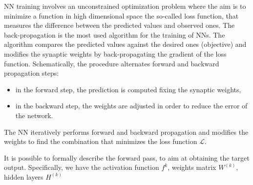 \documentclass[a4,12pt]{article}
\begin{document}


NN training involves an unconstrained optimization problem where the aim is to minimize a
function in high dimensional space the so-called loss function, that measures the difference between the predicted values and observed ones.
The back-propagation is the most used algorithm for the training of NNs. The algorithm compares the predicted values against the desired ones (objective)
and modifies the synaptic weights by back-propagating the gradient of the loss function. Schematically,
the procedure alternates forward and backward propagation steps:
\begin{itemize}
\item in the forward step, the prediction is computed fixing the synaptic weights,
\item in the backward step, the weights are adjusted in order to reduce the error of the network.
\end{itemize}
The NN iteratively performs forward and backward propagation and modifies the weights to
find the combination that minimizes the loss function $\mathcal{L}$.

It is possible to formally describe the forward pass, to aim at obtaining the target output. Specifically, we have the activation function $f^k$, weights matrix $W^{(k)}$, hidden layers $H^{(k)}$
\end{document}
